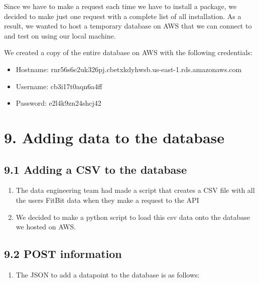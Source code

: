 \documentclass[]{book}
\providecommand{\tightlist}{%
  \setlength{\itemsep}{0pt}\setlength{\parskip}{0pt}}
\begin{document}
Since we have to make a request each time we have to install a package, we decided to make just one request with a complete list of all installation. As a result, we wanted to host a temporary database on AWS that we can connect to and test on using our local machine.

We created a copy of the entire database on AWS with the following credentials:

\begin{itemize}
\tightlist
\item
  Hostname: rnr56s6e2uk326pj.cbetxkdyhwsb.us-east-1.rds.amazonaws.com
\item
  Username: cb3i17t0aqn6a4ff
\item
  Password: e2l4k9zn24shcj42
\end{itemize}

\hypertarget{adding-data-to-the-database}{%
\section{9. Adding data to the database}\label{adding-data-to-the-database}}

\hypertarget{adding-a-csv-to-the-database}{%
\subsection{9.1 Adding a CSV to the database}\label{adding-a-csv-to-the-database}}

\begin{enumerate}
\def\labelenumi{\arabic{enumi}.}
\tightlist
\item
  The data engineering team had made a script that creates a CSV file with all the users FitBit data when they make a request to the API
\item
  We decided to make a python script to load this csv data onto the database we hosted on AWS.
\end{enumerate}

\hypertarget{post-information}{%
\subsection{9.2 POST information}\label{post-information}}

\begin{enumerate}
\def\labelenumi{\arabic{enumi}.}
\tightlist
\item
  The JSON to add a datapoint to the database is as follows:
\end{enumerate}
\end{document}
